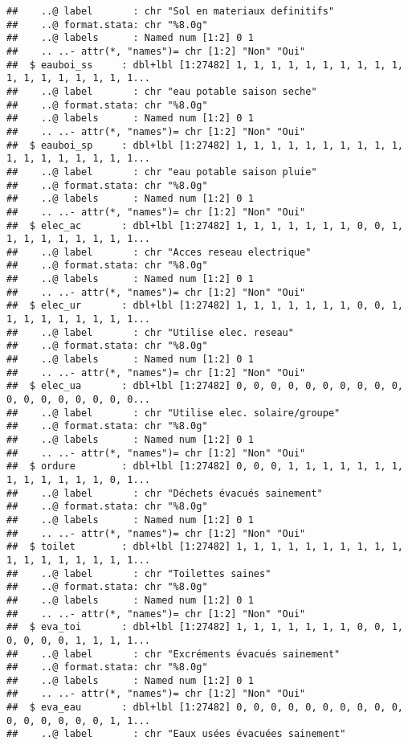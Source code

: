 \documentclass[
]{article}
\begin{document}
\begin{verbatim}
##    ..@ label       : chr "Sol en materiaux definitifs"
##    ..@ format.stata: chr "%8.0g"
##    ..@ labels      : Named num [1:2] 0 1
##    .. ..- attr(*, "names")= chr [1:2] "Non" "Oui"
##  $ eauboi_ss     : dbl+lbl [1:27482] 1, 1, 1, 1, 1, 1, 1, 1, 1, 1, 1, 1, 1, 1, 1, 1, 1, 1...
##    ..@ label       : chr "eau potable saison seche"
##    ..@ format.stata: chr "%8.0g"
##    ..@ labels      : Named num [1:2] 0 1
##    .. ..- attr(*, "names")= chr [1:2] "Non" "Oui"
##  $ eauboi_sp     : dbl+lbl [1:27482] 1, 1, 1, 1, 1, 1, 1, 1, 1, 1, 1, 1, 1, 1, 1, 1, 1, 1...
##    ..@ label       : chr "eau potable saison pluie"
##    ..@ format.stata: chr "%8.0g"
##    ..@ labels      : Named num [1:2] 0 1
##    .. ..- attr(*, "names")= chr [1:2] "Non" "Oui"
##  $ elec_ac       : dbl+lbl [1:27482] 1, 1, 1, 1, 1, 1, 1, 0, 0, 1, 1, 1, 1, 1, 1, 1, 1, 1...
##    ..@ label       : chr "Acces reseau electrique"
##    ..@ format.stata: chr "%8.0g"
##    ..@ labels      : Named num [1:2] 0 1
##    .. ..- attr(*, "names")= chr [1:2] "Non" "Oui"
##  $ elec_ur       : dbl+lbl [1:27482] 1, 1, 1, 1, 1, 1, 1, 0, 0, 1, 1, 1, 1, 1, 1, 1, 1, 1...
##    ..@ label       : chr "Utilise elec. reseau"
##    ..@ format.stata: chr "%8.0g"
##    ..@ labels      : Named num [1:2] 0 1
##    .. ..- attr(*, "names")= chr [1:2] "Non" "Oui"
##  $ elec_ua       : dbl+lbl [1:27482] 0, 0, 0, 0, 0, 0, 0, 0, 0, 0, 0, 0, 0, 0, 0, 0, 0, 0...
##    ..@ label       : chr "Utilise elec. solaire/groupe"
##    ..@ format.stata: chr "%8.0g"
##    ..@ labels      : Named num [1:2] 0 1
##    .. ..- attr(*, "names")= chr [1:2] "Non" "Oui"
##  $ ordure        : dbl+lbl [1:27482] 0, 0, 0, 1, 1, 1, 1, 1, 1, 1, 1, 1, 1, 1, 1, 1, 0, 1...
##    ..@ label       : chr "Déchets évacués sainement"
##    ..@ format.stata: chr "%8.0g"
##    ..@ labels      : Named num [1:2] 0 1
##    .. ..- attr(*, "names")= chr [1:2] "Non" "Oui"
##  $ toilet        : dbl+lbl [1:27482] 1, 1, 1, 1, 1, 1, 1, 1, 1, 1, 1, 1, 1, 1, 1, 1, 1, 1...
##    ..@ label       : chr "Toilettes saines"
##    ..@ format.stata: chr "%8.0g"
##    ..@ labels      : Named num [1:2] 0 1
##    .. ..- attr(*, "names")= chr [1:2] "Non" "Oui"
##  $ eva_toi       : dbl+lbl [1:27482] 1, 1, 1, 1, 1, 1, 1, 0, 0, 1, 0, 0, 0, 0, 1, 1, 1, 1...
##    ..@ label       : chr "Excréments évacués sainement"
##    ..@ format.stata: chr "%8.0g"
##    ..@ labels      : Named num [1:2] 0 1
##    .. ..- attr(*, "names")= chr [1:2] "Non" "Oui"
##  $ eva_eau       : dbl+lbl [1:27482] 0, 0, 0, 0, 0, 0, 0, 0, 0, 0, 0, 0, 0, 0, 0, 0, 1, 1...
##    ..@ label       : chr "Eaux usées évacuées sainement"

\end{verbatim}
\end{document}
